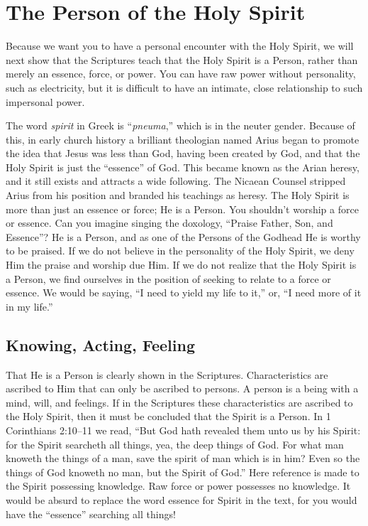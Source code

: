 \chapter{The Person of the Holy Spirit}

Because we want you to have a personal encounter
with the Holy Spirit, we will next show that the Scriptures
teach that the Holy Spirit is a Person, rather than merely an
essence, force, or power. You can have raw power without
personality, such as electricity, but it is difficult to have an
intimate, close relationship to such impersonal power.

The word \emph{spirit} in Greek is “\emph{pneuma},” which is in the
neuter gender. Because of this, in early church history a brilliant
theologian named Arius began to promote the idea
that Jesus was less than God, having been created by God,
and that the Holy Spirit is just the “essence” of God. This
became known as the Arian heresy, and it still exists and
attracts a wide following. The Nicaean Counsel stripped
Arius from his position and branded his teachings as heresy.
The Holy Spirit is more than just an essence or force; He
is a Person. You shouldn’t worship a force or essence. Can
you imagine singing the doxology, “Praise Father, Son, and
Essence”? He is a Person, and as one of the Persons of the
Godhead He is worthy to be praised. If we do not believe in
the personality of the Holy Spirit, we deny Him the praise
and worship due Him. If we do not realize that the Holy
Spirit is a Person, we find ourselves in the position of seeking
to relate to a force or essence. We would be saying, “I
need to yield my life to it,” or, “I need more of it in my
life.”


\section*{Knowing, Acting, Feeling}

That He is a Person is clearly shown in the Scriptures.
Characteristics are ascribed to Him that can only be ascribed
to persons. A person is a being with a mind, will, and feelings.
If in the Scriptures these characteristics are ascribed
to the Holy Spirit, then it must be concluded that the Spirit
is a Person. In 1 Corinthians 2:10–11 we read, “But God
hath revealed them unto us by his Spirit: for the Spirit searcheth
all things, yea, the deep things of God. For what man
knoweth the things of a man, save the spirit of man which is
in him? Even so the things of God knoweth no man, but the
Spirit of God.” Here reference is made to the Spirit possessing
knowledge. Raw force or power possesses no knowledge.
It would be absurd to replace the word essence for
Spirit in the text, for you would have the “essence” searching
all things!

